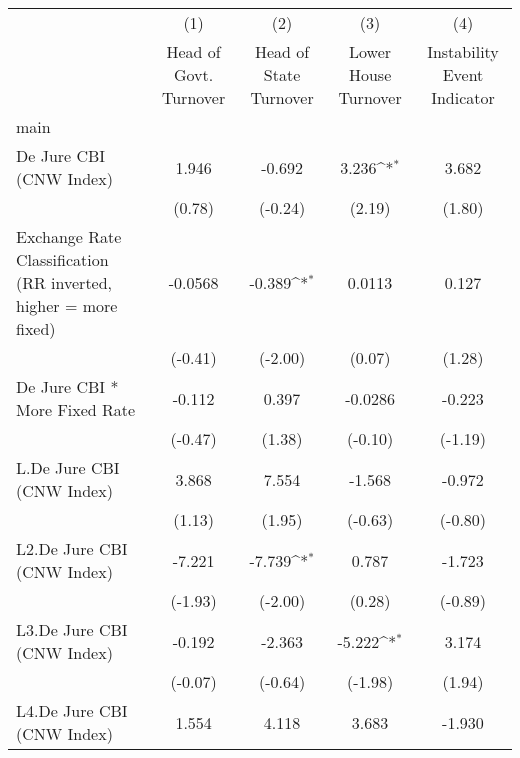 {
\def\sym#1{\ifmmode^{#1}\else\(^{#1}\)\fi}
\begin{longtable}{l*{4}{c}}
\hline\hline\endfirsthead\hline\endhead\hline\endfoot\endlastfoot
                &\multicolumn{1}{c}{(1)}&\multicolumn{1}{c}{(2)}&\multicolumn{1}{c}{(3)}&\multicolumn{1}{c}{(4)}\\
                &\multicolumn{1}{c}{Head of Govt. Turnover}&\multicolumn{1}{c}{Head of State Turnover}&\multicolumn{1}{c}{Lower House Turnover}&\multicolumn{1}{c}{Instability Event Indicator}\\
\hline
main            &                  &                  &                  &                  \\
De Jure CBI (CNW Index)&    1.946         &   -0.692         &    3.236\sym{*}  &    3.682         \\
                &   (0.78)         &  (-0.24)         &   (2.19)         &   (1.80)         \\
[1em]
Exchange Rate Classification (RR inverted, higher = more fixed)&  -0.0568         &   -0.389\sym{*}  &   0.0113         &    0.127         \\
                &  (-0.41)         &  (-2.00)         &   (0.07)         &   (1.28)         \\
[1em]
De Jure CBI * More Fixed Rate&   -0.112         &    0.397         &  -0.0286         &   -0.223         \\
                &  (-0.47)         &   (1.38)         &  (-0.10)         &  (-1.19)         \\
[1em]
L.De Jure CBI (CNW Index)&    3.868         &    7.554         &   -1.568         &   -0.972         \\
                &   (1.13)         &   (1.95)         &  (-0.63)         &  (-0.80)         \\
[1em]
L2.De Jure CBI (CNW Index)&   -7.221         &   -7.739\sym{*}  &    0.787         &   -1.723         \\
                &  (-1.93)         &  (-2.00)         &   (0.28)         &  (-0.89)         \\
[1em]
L3.De Jure CBI (CNW Index)&   -0.192         &   -2.363         &   -5.222\sym{*}  &    3.174         \\
                &  (-0.07)         &  (-0.64)         &  (-1.98)         &   (1.94)         \\
[1em]
L4.De Jure CBI (CNW Index)&    1.554         &    4.118         &    3.683         &   -1.930         \\

\end{longtable}}
